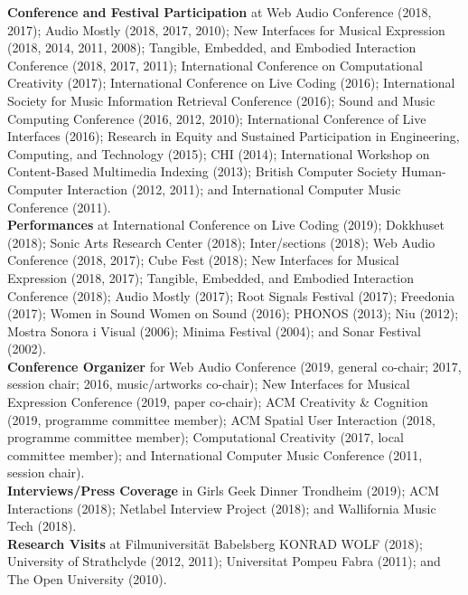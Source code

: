 \documentclass[10pt, a4paper]{article}
\begin{document}
{\textbf{Conference and Festival Participation}} at Web Audio Conference (2018, 2017); Audio Mostly (2018, 2017, 2010); New Interfaces for Musical Expression (2018, 2014, 2011, 2008); Tangible, Embedded, and Embodied Interaction Conference (2018, 2017, 2011); International Conference on Computational Creativity (2017); International Conference on Live Coding (2016); International Society for Music Information Retrieval Conference (2016); Sound and Music Computing Conference (2016, 2012, 2010); International Conference of Live Interfaces (2016); Research in Equity and Sustained Participation in Engineering, Computing, and Technology (2015); CHI (2014); International Workshop on Content-Based Multimedia Indexing (2013); British Computer Society Human-Computer Interaction (2012, 2011); and International Computer Music Conference (2011).\\

{\textbf{Performances}} at International Conference on Live Coding (2019); Dokkhuset (2018); Sonic Arts Research Center (2018); Inter/sections (2018); Web Audio Conference (2018, 2017); Cube Fest (2018); New Interfaces for Musical Expression (2018, 2017); Tangible, Embedded, and Embodied Interaction Conference (2018); Audio Mostly (2017); Root Signals Festival (2017); Freedonia (2017); Women in Sound Women on Sound (2016); PHONOS (2013); Niu (2012); Mostra Sonora i Visual (2006); Minima Festival (2004); and Sonar Festival (2002).\\

{\textbf{Conference Organizer}} for Web Audio Conference (2019, general co-chair; 2017, session chair; 2016, music/artworks co-chair); New Interfaces for Musical Expression Conference (2019, paper co-chair); ACM Creativity \& Cognition (2019, programme committee member); ACM Spatial User Interaction (2018, programme committee member); Computational Creativity (2017, local committee member); and International Computer Music Conference (2011, session chair).\\

{\textbf{Interviews/Press Coverage}} in Girls Geek Dinner Trondheim (2019); ACM Interactions (2018); Netlabel Interview Project (2018); and Wallifornia Music Tech (2018).\\

{\textbf{Research Visits}} at Filmuniversität Babelsberg KONRAD WOLF (2018); University of Strathclyde (2012, 2011); Universitat Pompeu Fabra (2011); and The Open University (2010).\\
\end{document}
